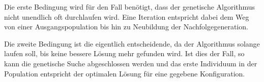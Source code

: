 Die erste Bedingung wird für den Fall benötigt, dass der genetische Algorithmus nicht unendlich oft durchlaufen wird. Eine Iteration entspricht dabei dem Weg von einer Ausgangspopulation bis hin zu Neubildung der Nachfolgegeneration.

Die zweite Bedingung ist die eigentlich entscheidende, da der Algorithmus solange laufen soll, bis keine bessere Lösung mehr gefunden wird. Ist dies der Fall, so kann die genetische Suche abgeschlossen werden und das erste Individuum in der Population entspricht der optimalen Lösung für eine gegebene Konfiguration.
